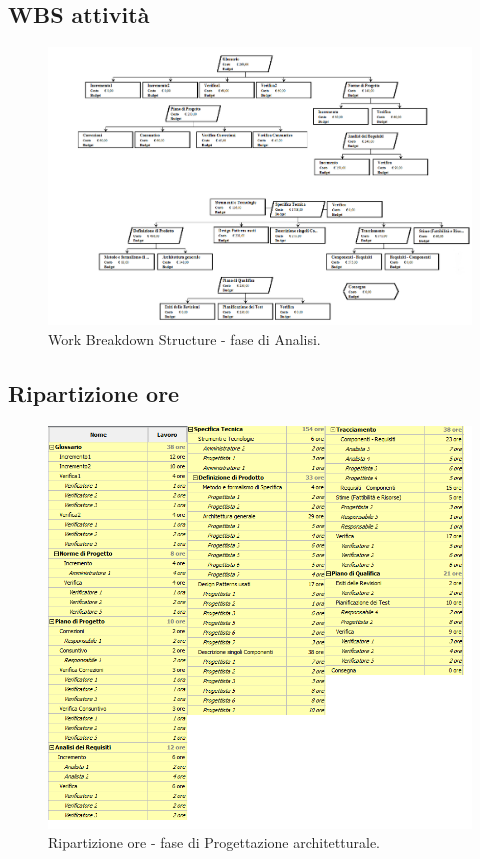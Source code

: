 \documentclass[a4paper]{report}
\begin{document}
			\subsection{WBS attività}
				\begin{figure}[H]
					\centering
					\includegraphics[scale=0.3]{WBSProgettazione}
					\caption{Work Breakdown Structure - fase di Analisi.}
				\end{figure}
			\subsection{Ripartizione ore}
				\begin{figure}[H]
					\centering
					\includegraphics[scale=0.6]{ROProgettazione}
					\caption{Ripartizione ore - fase di Progettazione architetturale.}
				\end{figure}
				
\end{document}
